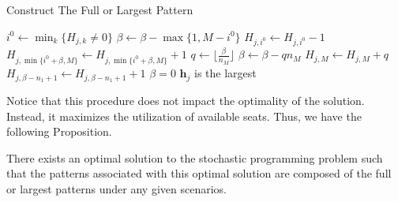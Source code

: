 \begin{algorithm}
  \caption{Construct The Full or Largest Pattern}\label{construction}
  {
    {$i^{0} \gets \min_{k}\{H_{j,k} \neq 0\}$\;
    {$\beta \gets \beta - \max\{1, M - i^{0}\}$\; $H_{j,i^{0}} \gets H_{j,i^{0}} - 1$\;
    $H_{j,\min\{i^{0}+\beta, M\}} \gets H_{j,\min\{i^{0}+\beta, M\}} + 1$\;}
    {
    {$q \gets \lfloor\frac{\beta}{n_M}\rfloor$\;
     $\beta \gets \beta - q n_M$\; $H_{j,M} \gets H_{j,M} + q$}
    {
    {$H_{j,\beta-n_1+1} \gets H_{j,\beta-n_1+1} + 1$\; $\beta = 0$\;}
    {$\bm{h}_j$ is the largest}}
    }}}
\end{algorithm}

Notice that this procedure does not impact the optimality of the solution. Instead, it maximizes the utilization of available seats. Thus, we have the following Proposition.

\begin{prop}\label{prop_solution}
There exists an optimal solution to the stochastic programming problem such that the patterns associated with this optimal solution are composed of the full or largest patterns under any given scenarios.
\end{prop}

